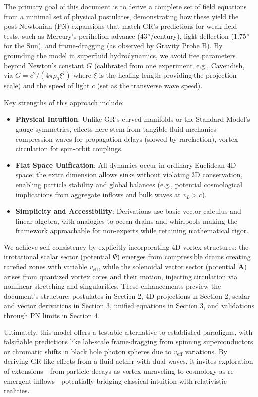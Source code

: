 \documentclass{article}
\begin{document}
The primary goal of this document is to derive a complete set of field equations from a minimal set of physical postulates, demonstrating how these yield the post-Newtonian (PN) expansions that match GR's predictions for weak-field tests, such as Mercury's perihelion advance (43''/century), light deflection (1.75'' for the Sun), and frame-dragging (as observed by Gravity Probe B). By grounding the model in superfluid hydrodynamics, we avoid free parameters beyond Newton's constant $G$ (calibrated from one experiment, e.g., Cavendish, via $G = c^2 / (4\pi \rho_0 \xi^2)$ where $\xi$ is the healing length providing the projection scale) and the speed of light $c$ (set as the transverse wave speed).

Key strengths of this approach include:
\begin{itemize}
    \item \textbf{Physical Intuition}: Unlike GR's curved manifolds or the Standard Model's gauge symmetries, effects here stem from tangible fluid mechanics---compression waves for propagation delays (slowed by rarefaction), vortex circulation for spin-orbit couplings.
    \item \textbf{Flat Space Unification}: All dynamics occur in ordinary Euclidean 4D space; the extra dimension allows sinks without violating 3D conservation, enabling particle stability and global balances (e.g., potential cosmological implications from aggregate inflows and bulk waves at $v_L > c$).
    \item \textbf{Simplicity and Accessibility}: Derivations use basic vector calculus and linear algebra, with analogies to ocean drains and whirlpools making the framework approachable for non-experts while retaining mathematical rigor.
\end{itemize}

We achieve self-consistency by explicitly incorporating 4D vortex structures: the irrotational scalar sector (potential $\Psi$) emerges from compressible drains creating rarefied zones with variable $v_{\text{eff}}$, while the solenoidal vector sector (potential $\mathbf{A}$) arises from quantized vortex cores and their motion, injecting circulation via nonlinear stretching and singularities. These enhancements preview the document's structure: postulates in Section 2, 4D projections in Section 2, scalar and vector derivations in Section 3, unified equations in Section 3, and validations through PN limits in Section 4.

Ultimately, this model offers a testable alternative to established paradigms, with falsifiable predictions like lab-scale frame-dragging from spinning superconductors or chromatic shifts in black hole photon spheres due to $v_{\text{eff}}$ variations. By deriving GR-like effects from a fluid aether with dual waves, it invites exploration of extensions---from particle decays as vortex unraveling to cosmology as re-emergent inflows---potentially bridging classical intuition with relativistic realities.
\end{document}
